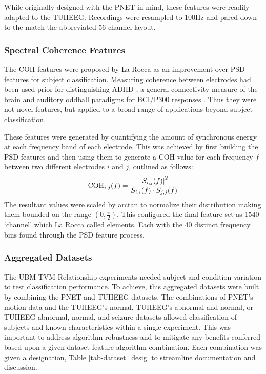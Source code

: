 While originally designed with the \ac{PNET} in mind, these features were readily adapted to the \ac{TUHEEG}. Recordings were resampled to 100Hz and pared down to the match the abbreviated 56 channel layout.

\subsubsection{Spectral Coherence Features}

The \ac{COH} features were proposed by La Rocca as an improvement  over \ac{PSD} features for subject classification. Measuring coherence between electrodes had been used prior for distinguishing \ac{ADHD} \cite{Monastra2001}, a general connectivity measure of the brain \cite{Makeig2012} and auditory oddball paradigms for \ac{BCI}/P300 responses \cite{Guntekin2016}. Thus they were not novel features, but applied to a broad range of applications beyond subject classification.

These features were generated by quantifying the amount of synchronous energy at each frequency band of each electrode. This was achieved by first building the \ac{PSD} features and then using them to generate a \ac{COH} value for each frequency $f$ between two different electrodes $i$ and $j$, outlined as follows:
\begin{equation}
\text{COH}_{i,j}(f) = {\frac{\left | {S_{i,j}(f)} \right |^{2}}{S_{i,i}(f) \cdot S_{j,j}(f)}}
\end{equation}
The resultant values were scaled by arctan to normalize their distribution making them bounded on the range $(0,\frac{\pi}{2})$. This configured the final feature set as 1540 `channel' which La Rocca called elements. Each with the 40 distinct frequency bins found through the \ac{PSD} feature process.

\subsubsection{Aggregated Datasets}

The \ac{UBM}-\ac{TVM} Relationship experiments needed subject and condition variation to test classification performance. To achieve, this aggregated datasets were built by combining the \ac{PNET} and \ac{TUHEEG} datasets. The combinations of \ac{PNET}'s motion data and the \ac{TUHEEG}'s normal, \ac{TUHEEG}'s abnormal and normal, or \ac{TUHEEG} abnormal, normal, and seizure datasets allowed classification of subjects and known characteristics within a single experiment. This was important to address algorithm robustness and to mitigate any benefits conferred based upon a given dataset-feature-algorithm combination. Each combination was given a designation, Table \ref{tab-dataset_desig} to streamline documentation and discussion.

